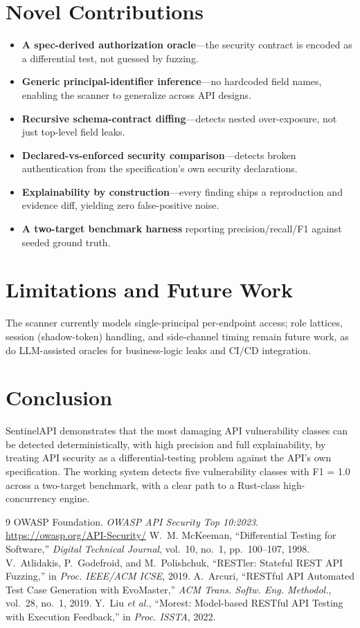 \documentclass[conference]{IEEEtran}
\begin{document}
\section{Novel Contributions}
\begin{itemize}
\item \textbf{A spec-derived authorization oracle}---the security contract is
  encoded as a differential test, not guessed by fuzzing.
\item \textbf{Generic principal-identifier inference}---no hardcoded field names,
  enabling the scanner to generalize across API designs.
\item \textbf{Recursive schema-contract diffing}---detects nested over-exposure,
  not just top-level field leaks.
\item \textbf{Declared-vs-enforced security comparison}---detects broken
  authentication from the specification's own security declarations.
\item \textbf{Explainability by construction}---every finding ships a
  reproduction and evidence diff, yielding zero false-positive noise.
\item \textbf{A two-target benchmark harness} reporting precision/recall/F1
  against seeded ground truth.
\end{itemize}

\section{Limitations and Future Work}
The scanner currently models single-principal per-endpoint access; role lattices,
session (shadow-token) handling, and side-channel timing remain future work, as
do LLM-assisted oracles for business-logic leaks and CI/CD integration.

\section{Conclusion}
SentinelAPI demonstrates that the most damaging API vulnerability classes can be
detected deterministically, with high precision and full explainability, by
treating API security as a differential-testing problem against the API's own
specification. The working system detects five vulnerability classes with F1 =
1.0 across a two-target benchmark, with a clear path to a Rust-class
high-concurrency engine.

\begin{thebibliography}{9}
OWASP Foundation. \emph{OWASP API Security Top 10:2023}. \url{https://owasp.org/API-Security/}
W.~M. McKeeman, ``Differential Testing for Software,'' \emph{Digital Technical Journal}, vol.~10, no.~1, pp.~100--107, 1998.
V.~Atlidakis, P.~Godefroid, and M.~Polishchuk, ``RESTler: Stateful REST API Fuzzing,'' in \emph{Proc. IEEE/ACM ICSE}, 2019.
A.~Arcuri, ``RESTful API Automated Test Case Generation with EvoMaster,'' \emph{ACM Trans. Softw. Eng. Methodol.}, vol.~28, no.~1, 2019.
Y.~Liu \emph{et al.}, ``Morest: Model-based RESTful API Testing with Execution Feedback,'' in \emph{Proc. ISSTA}, 2022.
\end{thebibliography}
\end{document}
